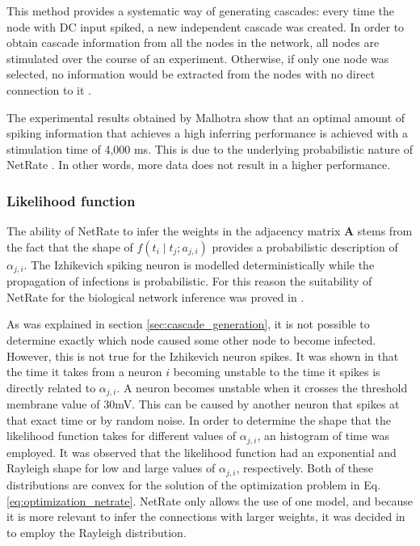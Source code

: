 \documentclass[11pt]{article}
\begin{document}
This method provides a systematic way of generating cascades: every time the node with DC input spiked, a new independent cascade was created. In order to obtain cascade information from all the nodes in the network, all nodes are stimulated over the course of an experiment. Otherwise, if only one node was selected, no information would be extracted from the nodes with no direct connection to it \cite{pranav_report}. 

The experimental results obtained by Malhotra show that an optimal amount of spiking information that achieves a high inferring performance is achieved with a stimulation time of 4,000 ms. This is due to the underlying probabilistic nature of NetRate \cite{pranav_report}. In other words, more data does not result in a higher performance.

\subsubsection{Likelihood function}

The ability of NetRate to infer the weights in the adjacency matrix \textbf{A} stems from the fact that the shape of $f(t_{i}\mid t_{j};a_{j,i})$ provides a probabilistic description of $\alpha_{j,i}$. The Izhikevich spiking neuron is modelled deterministically while the propagation of infections is probabilistic. For this reason the suitability of NetRate for the biological network inference was proved in \cite{alexandru2018estimating}.

As was explained in section \ref{sec:cascade_generation}, it is not possible to determine exactly which node caused some other node to become infected. However, this is not true for the Izhikevich neuron spikes. It was shown in \cite{alexandru2018estimating} that the time it takes from a neuron $i$ becoming unstable to the time it spikes is directly related to $\alpha_{j,i}$. A neuron becomes unstable when it crosses the threshold membrane value of 30mV. This can be caused by another neuron that spikes at that exact time or by random noise. In order to determine the shape that the likelihood function takes for different values of $\alpha_{j,i}$, an histogram of time was employed. It was observed that the likelihood function had an exponential and Rayleigh shape for low and large values of $\alpha_{j,i}$, respectively. Both of these distributions are convex for the solution of the optimization problem in Eq.\ref{eq:optimization_netrate}. NetRate only allows the use of one model, and because it is more relevant to infer the connections with larger weights, it was decided in \cite{alexandru2018estimating} to employ the Rayleigh distribution. 
\end{document}
